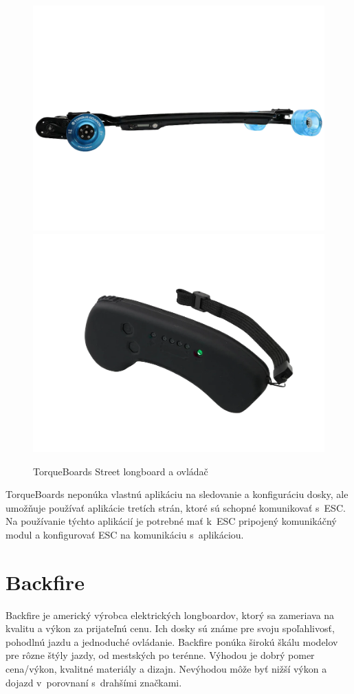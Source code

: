 \begin{figure}[h]
    \centering
    \includegraphics[width=0.48\linewidth]{figures/brand-reviews/torque-longboard.png}\hfill
    \includegraphics[width=0.48\linewidth]{figures/brand-reviews/torque-controller.png}
    \caption{TorqueBoards Street longboard a ovládač\cite{TorqueBoards}}\label{fig:torqueboards}
\end{figure}

TorqueBoards neponúka vlastnú aplikáciu na sledovanie a konfiguráciu dosky, ale umožňuje používať aplikácie tretích strán, ktoré sú schopné komunikovať s~ESC.
Na používanie týchto aplikácií je potrebné mať k~ESC pripojený komunikáčný modul a konfigurovať ESC na komunikáciu s~aplikáciou.\cite{TorqueBoards}

\section{Backfire}
Backfire je americký výrobca elektrických longboardov, ktorý sa zameriava na kvalitu a výkon za prijateľnú cenu.
Ich dosky sú známe pre svoju spoľahlivosť, pohodlnú jazdu a jednoduché ovládanie.
Backfire ponúka širokú škálu modelov pre rôzne štýly jazdy, od mestských po terénne.
Výhodou je dobrý pomer cena/výkon, kvalitné materiály a dizajn.
Nevýhodou môže byť nižší výkon a dojazd v~porovnaní s~drahšími značkami.

